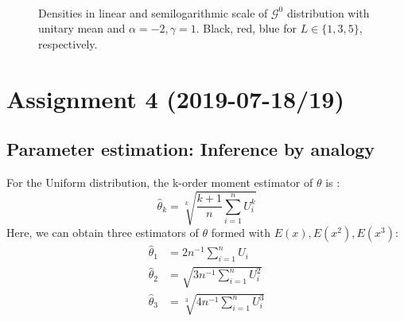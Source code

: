 \documentclass[conference,onecolumn]{IEEEtran}
\begin{document}
\begin{figure}[htb]
	\centering
	\ 
	\ 
	\caption{Densities in linear and semilogarithmic scale of $\mathcal{G}^0$ distribution with unitary mean and $\alpha=-2,\gamma=1$. Black, red, blue for $L\in\{1,3,5\}$, respectively.}
	\label{Fig:G_dis_L}
\end{figure}

\section{Assignment 4 (2019-07-18/19)}
\subsection{Parameter estimation: Inference by analogy} 

For the Uniform distribution, the k-order moment estimator of $\theta$ is :
\begin{equation}
\widehat{\theta}_k = \sqrt[k]{\frac{k+1}{n} \sum_{i=1}^{n} U_i^k}
\end{equation}
Here, we can obtain three estimators of $\theta$ formed with $E(x), E(x^2), E(x^3)$:
\begin{equation}
\begin{split}
\widehat{\theta}_1 &= 2n^{-1}\sum_{i=1}^n U_i \\
\widehat{\theta}_2 &= \sqrt{3n^{-1}\sum_{i=1}^{n} U_i^2} \\
\widehat{\theta}_3 &= \sqrt[3]{4n^{-1} \sum_{i=1}^{n} U_i^3} \\
\end{split}
\end{equation}
\end{document}
